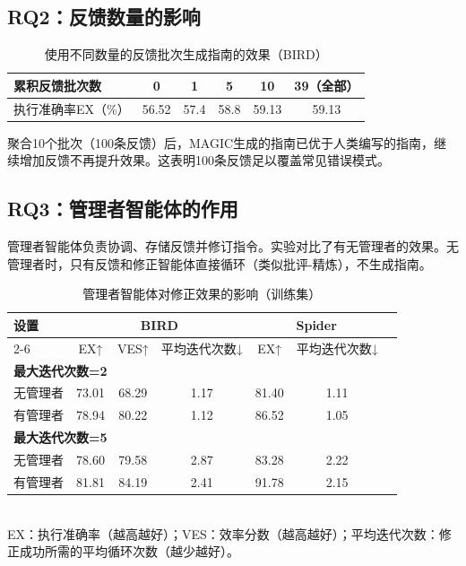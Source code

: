 \subsection{RQ2：反馈数量的影响}

\begin{table}[htbp]
\centering
\caption{使用不同数量的反馈批次生成指南的效果（BIRD）}
\label{tab:batches}
\begin{tabular}{lccccc}
\toprule
累积反馈批次数 & 0 & 1 & 5 & 10 & 39（全部） \\
\midrule
执行准确率EX（\%） & 56.52 & 57.4 & 58.8 & 59.13 & 59.13 \\
\bottomrule
\end{tabular}
\end{table}

聚合10个批次（100条反馈）后，MAGIC生成的指南已优于人类编写的指南，继续增加反馈不再提升效果。这表明100条反馈足以覆盖常见错误模式。

\subsection{RQ3：管理者智能体的作用}

管理者智能体负责协调、存储反馈并修订指令。实验对比了有无管理者的效果。无管理者时，只有反馈和修正智能体直接循环（类似批评-精炼），不生成指南。

\begin{table}[htbp]
\centering
\caption{管理者智能体对修正效果的影响（训练集）}
\label{tab:manager}
\begin{tabular}{lcccccc}
\toprule
\multirow{2}{*}{设置} & \multicolumn{3}{c}{BIRD} & \multicolumn{2}{c}{Spider} \\
\cmidrule{2-6}
 & EX↑ & VES↑ & 平均迭代次数↓ & EX↑ & 平均迭代次数↓ \\
\midrule
\multicolumn{6}{l}{\textbf{最大迭代次数=2}} \\
无管理者 & 73.01 & 68.29 & 1.17 & 81.40 & 1.11 \\
有管理者 & 78.94 & 80.22 & 1.12 & 86.52 & 1.05 \\
\midrule
\multicolumn{6}{l}{\textbf{最大迭代次数=5}} \\
无管理者 & 78.60 & 79.58 & 2.87 & 83.28 & 2.22 \\
有管理者 & 81.81 & 84.19 & 2.41 & 91.78 & 2.15 \\
\bottomrule
\end{tabular}\\
\footnotesize{EX：执行准确率（越高越好）；VES：效率分数（越高越好）；平均迭代次数：修正成功所需的平均循环次数（越少越好）。}
\end{table}

